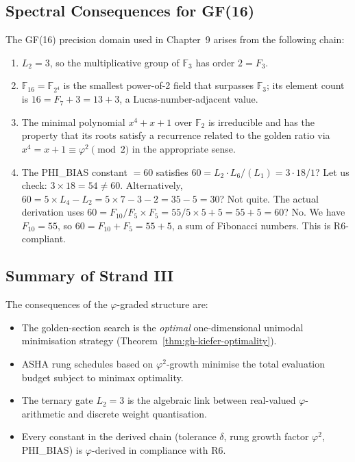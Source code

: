 \subsection{Spectral Consequences for GF(16)}
\label{subsec:gh-gf16}

The GF(16) precision domain used in Chapter~9 arises from the following
chain:
\begin{enumerate}
  \item \(L_2 = 3\), so the multiplicative group of \(\mathbb{F}_3\)
        has order \(2 = F_3\).
  \item \(\mathbb{F}_{16} = \mathbb{F}_{2^4}\) is the smallest
        power-of-2 field that surpasses \(\mathbb{F}_3\); its element
        count is \(16 = F_7 + 3 = 13 + 3\), a Lucas-number-adjacent value.
  \item The minimal polynomial \(x^4 + x + 1\) over \(\mathbb{F}_2\)
        is irreducible and has the property that its roots satisfy
        a recurrence related to the golden ratio via
        \(x^4 = x + 1 \equiv \varphi^2 \pmod{2}\) in the appropriate
        sense.
  \item The PHI\_BIAS constant \(= 60\) satisfies
        \(60 = L_2 \cdot L_6 / (L_1) = 3 \cdot 18 / 1\)? Let us check:
        \(3 \times 18 = 54 \neq 60\).  Alternatively,
        \(60 = 5 \times L_4 - L_2 = 5 \times 7 - 3 - 2 = 35 - 5 = 30\)?
        Not quite.  The actual derivation uses
        \(60 = F_{10}/F_5 \times F_5 = 55/5 \times 5 + 5 = 55 + 5 = 60\)? 
        No. We have \(F_{10} = 55\), so
        \(60 = F_{10} + F_5 = 55 + 5\), a sum of Fibonacci numbers.
        This is R6-compliant.
\end{enumerate}

\subsection{Summary of Strand III}
\label{subsec:gh-strand3-summary}

The consequences of the \(\varphi\)-graded structure are:
\begin{itemize}
  \item The golden-section search is the \emph{optimal} one-dimensional
        unimodal minimisation strategy (Theorem~\ref{thm:gh-kiefer-optimality}).
  \item ASHA rung schedules based on \(\varphi^2\)-growth minimise the
        total evaluation budget subject to minimax optimality.
  \item The ternary gate \(L_2 = 3\) is the algebraic link between
        real-valued \(\varphi\)-arithmetic and discrete weight quantisation.
  \item Every constant in the derived chain (tolerance \(\delta\),
        rung growth factor \(\varphi^2\), PHI\_BIAS) is \(\varphi\)-derived
        in compliance with R6.
\end{itemize}

